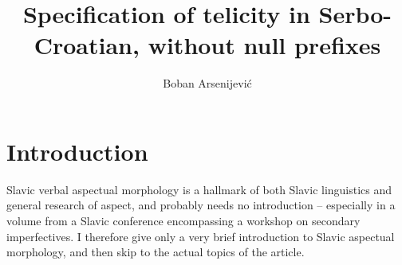\documentclass[output=paper]{langscibook}
\author{Boban Arsenijević\affiliation{University of Graz}}
\title{Specification of telicity in Serbo-Croatian, without null prefixes}
\begin{document}


\maketitle

\section{Introduction}\label{ars:sec:intro}\largerpage

Slavic verbal aspectual morphology is a hallmark of both Slavic linguistics and general research of aspect, and probably needs no introduction -- especially in a volume from a Slavic conference encompassing a workshop on secondary imperfectives. I therefore give only a very brief introduction to Slavic aspectual morphology, and then skip to the actual topics of the article. 
\end{document}
